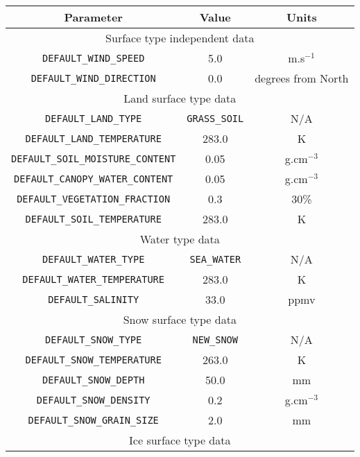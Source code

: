\begin{table}
  \centering
  \begin{tabular}{|c|c|c|}
    \hline
    \sffamily\textbf{Parameter} & \sffamily\textbf{Value}  & \sffamily\textbf{Units} \\
    \hline\hline
    \multicolumn{3}{|c|}{Surface type independent data}\\
    \hline
    \texttt{DEFAULT\_WIND\_SPEED}             & 5.0        & m.s$^{-1}$\\
    \texttt{DEFAULT\_WIND\_DIRECTION}         & 0.0        & degrees from North\\
    \hline
    \multicolumn{3}{|c|}{Land surface type data}\\
    \hline
    \texttt{DEFAULT\_LAND\_TYPE}              & \texttt{GRASS\_SOIL}& N/A \\
    \texttt{DEFAULT\_LAND\_TEMPERATURE}       & 283.0      & K\\
    \texttt{DEFAULT\_SOIL\_MOISTURE\_CONTENT} & 0.05       & g.cm$^{-3}$\\
    \texttt{DEFAULT\_CANOPY\_WATER\_CONTENT}  & 0.05       & g.cm$^{-3}$\\
    \texttt{DEFAULT\_VEGETATION\_FRACTION}    & 0.3        & 30\%\\
    \texttt{DEFAULT\_SOIL\_TEMPERATURE}       & 283.0      & K\\
    \hline
    \multicolumn{3}{|c|}{Water type data}\\
    \hline
    \texttt{DEFAULT\_WATER\_TYPE}             & \texttt{SEA\_WATER} & N/A\\
    \texttt{DEFAULT\_WATER\_TEMPERATURE}      & 283.0      & K\\
    \texttt{DEFAULT\_SALINITY}                & 33.0       & ppmv\\
    \hline
    \multicolumn{3}{|c|}{Snow surface type data}\\
    \hline
    \texttt{DEFAULT\_SNOW\_TYPE}              & \texttt{NEW\_SNOW}  & N/A\\
    \texttt{DEFAULT\_SNOW\_TEMPERATURE}       & 263.0      & K\\
    \texttt{DEFAULT\_SNOW\_DEPTH}             & 50.0       & mm\\
    \texttt{DEFAULT\_SNOW\_DENSITY}           & 0.2        & g.cm$^{-3}$\\
    \texttt{DEFAULT\_SNOW\_GRAIN\_SIZE}       & 2.0        & mm\\
    \hline
    \multicolumn{3}{|c|}{Ice surface type data}\\

\end{tabular}
\end{table}
